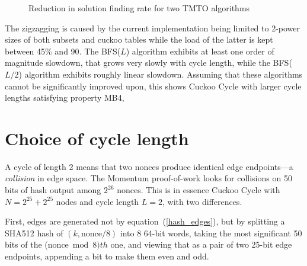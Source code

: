 \documentclass{beamer}
\begin{document}
\begin{figure}
\begin{center}
\end{center}
\caption{Reduction in solution finding rate for two TMTO algorithms}
\label{slowdown}
\end{figure}

The zigzagging is caused by the current implementation being limited to 2-power sizes of
both subsets and cuckoo tables while the load of the latter is kept between 45\% and 90.
The BFS($L$) algorithm exhibits at least one order of magnitude slowdown, that grows very slowly
with cycle length, while the BFS($L/2$) algorithm exhibits roughly linear slowdown.
Assuming that these algorithms cannot be significantly improved upon,
this shows Cuckoo Cycle with larger cycle lengths satisfying property MB4,

\section{Choice of cycle length}
\label{cycle_length_choice}
A cycle of length 2 means that two nonces produce identical edge endpoints---a {\em collision} in edge space.
The Momentum proof-of-work looks for collisions on 50 bits of hash output among $2^{26}$ nonces.
This is in essence Cuckoo Cycle with $N=2^{25}+2^{25}$ nodes and cycle length $L=2$, with
two differences.

First, edges are generated not by equation~(\ref{hash_edges}), but by splitting a SHA512 hash of
$(k,\mbox{nonce} / 8)$ into 8 64-bit words, taking the most significant 50 bits of the
($\mbox{nonce} \bmod 8)th$ one, and viewing that as a pair of two 25-bit edge endpoints, appending
a bit to make them even and odd.
\end{document}
